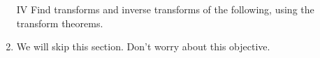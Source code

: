 \begin{enumerate}
\item[IV] Find transforms and inverse transforms of the following, using the transform theorems. 
\item We will skip this section.  Don't worry about this objective.








	
\end{enumerate}





